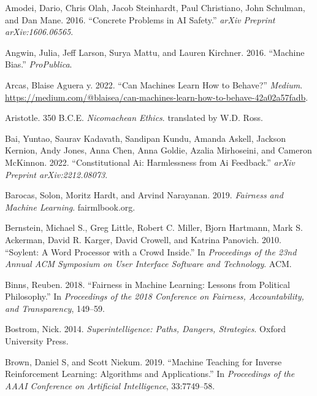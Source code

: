 \documentclass[
  letterpaper,
  numbers=noenddot,
  DIV=11,
  oneside]{scrreprt}
\newlength{\cslhangindent}
\newenvironment{CSLReferences}[2] %
 {\begin{list}{}{%
  \setlength{\itemindent}{0pt}
  \setlength{\leftmargin}{0pt}
  \setlength{\parsep}{0pt}
  \ifodd #1
   \setlength{\leftmargin}{\cslhangindent}
   \setlength{\itemindent}{-1\cslhangindent}
  \fi
  \setlength{\itemsep}{#2\baselineskip}}}
 {\end{list}}
\theoremstyle{remark}
\begin{document}
\label{refs-5}
\begin{CSLReferences}{1}{0}
Amodei, Dario, Chris Olah, Jacob Steinhardt, Paul Christiano, John
Schulman, and Dan Mane. 2016. {``Concrete Problems in AI Safety.''}
\emph{arXiv Preprint arXiv:1606.06565}.

Angwin, Julia, Jeff Larson, Surya Mattu, and Lauren Kirchner. 2016.
{``Machine Bias.''} \emph{ProPublica}.

Arcas, Blaise Aguera y. 2022. {``Can Machines Learn How to Behave?''}
\emph{Medium}.
\url{https://medium.com/@blaisea/can-machines-learn-how-to-behave-42a02a57fadb}.

Aristotle. 350 B.C.E. \emph{Nicomachean Ethics}. translated by W.D.
Ross.

Bai, Yuntao, Saurav Kadavath, Sandipan Kundu, Amanda Askell, Jackson
Kernion, Andy Jones, Anna Chen, Anna Goldie, Azalia Mirhoseini, and
Cameron McKinnon. 2022. {``Constitutional Ai: {Harmlessness} from Ai
Feedback.''} \emph{arXiv Preprint arXiv:2212.08073}.

Barocas, Solon, Moritz Hardt, and Arvind Narayanan. 2019. \emph{Fairness
and Machine Learning}. fairmlbook.org.

Bernstein, Michael S., Greg Little, Robert C. Miller, Bjorn Hartmann,
Mark S. Ackerman, David R. Karger, David Crowell, and Katrina Panovich.
2010. {``Soylent: A Word Processor with a Crowd Inside.''} In
\emph{Proceedings of the 23nd Annual ACM Symposium on User Interface
Software and Technology}. ACM.

Binns, Reuben. 2018. {``Fairness in Machine Learning: Lessons from
Political Philosophy.''} In \emph{Proceedings of the 2018 Conference on
Fairness, Accountability, and Transparency}, 149--59.

Bostrom, Nick. 2014. \emph{Superintelligence: Paths, Dangers,
Strategies}. Oxford University Press.

Brown, Daniel S, and Scott Niekum. 2019. {``Machine Teaching for Inverse
Reinforcement Learning: Algorithms and Applications.''} In
\emph{Proceedings of the AAAI Conference on Artificial Intelligence},
33:7749--58.


\end{CSLReferences}
\end{document}
